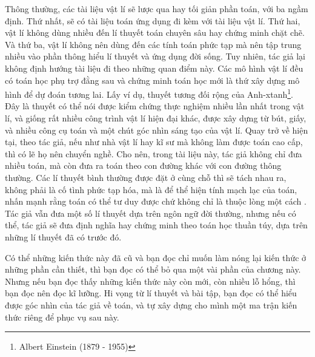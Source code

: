 Thông thường, các tài liệu vật lí sẽ lược qua hay tối giản phần toán, với ba ngầm định. Thứ nhất, sẽ có tài liệu toán ứng dụng đi kèm với tài liệu vật lí. Thứ hai, vật lí không dùng nhiều đến lí thuyết toán chuyên sâu hay chứng minh chặt chẽ. Và thứ ba, vật lí không nên dùng đến các tính toán phức tạp mà nên tập trung nhiều vào phần thông hiểu lí thuyết và ứng dụng đời sống. Tuy nhiên, tác giả lại không định hướng tài liệu đi theo những quan điểm này. Các mô hình vật lí đều có toán học phụ trợ đằng sau và chứng minh toán học mới là thứ xây dựng mô hình để dự đoán tương lai. Lấy ví dụ, thuyết tương đối rộng của Anh-xtanh\footnote{Albert Einstein (1879 - 1955)}. Đây là thuyết có thể nói được kiểm chứng thực nghiệm nhiều lần nhất trong vật lí, và giống rất nhiều công trình vật lí hiện đại khác, được xây dựng từ bút, giấy, và nhiều công cụ toán và một chút góc nhìn sáng tạo của vật lí. Quay trở về hiện tại, theo tác giả, nếu như nhà vật lí hay kĩ sư mà không làm được toán cao cấp, thì có lẽ họ nên chuyển nghề. Cho nên, trong tài liệu này, tác giả không chỉ đưa nhiều toán, mà còn đưa ra toán theo con đường khác với con đường thông thường. Các lí thuyết bình thường được đặt ở cùng chỗ thì sẽ tách nhau ra, không phải là cố tình phức tạp hóa, mà là để thể hiện tính mạch lạc của toán, nhấn mạnh rằng toán có thể tư duy được chứ không chỉ là thuộc lòng một cách . Tác giả vẫn đưa một số lí thuyết dựa trên ngôn ngữ đời thường, nhưng nếu có thể, tác giả sẽ đưa định nghĩa hay chứng minh theo toán học thuần túy, dựa trên những lí thuyết đã có trước đó.

Có thể những kiến thức này đã cũ và bạn đọc chỉ muốn làm nóng lại kiến thức ở những phần cần thiết, thì bạn đọc có thể bỏ qua một vài phần của chương này. Nhưng nếu bạn đọc thấy những kiến thức này còn mới, còn nhiều lỗ hổng, thì bạn đọc nên đọc kĩ lưỡng. Hi vọng từ lí thuyết và bài tập, bạn đọc có thể hiểu được góc nhìn của tác giả về toán, và tự xây dựng cho mình một ma trận kiến thức riêng để phục vụ sau này.




% 
